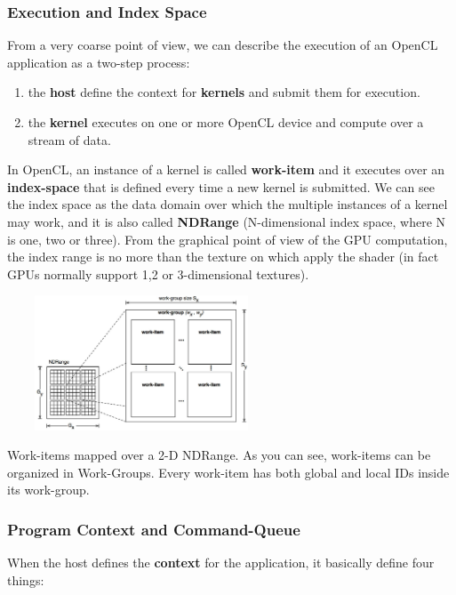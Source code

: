 \subsubsection{Execution and Index Space}

From a very coarse point of view, we can describe the execution of an OpenCL application as a two-step process:

\begin{enumerate}
	\item the \textbf{host} define the context for \textbf{kernels} and submit them for execution.
	\item the \textbf{kernel} executes on one or more OpenCL device and compute over a stream of data.
\end{enumerate}

In OpenCL, an instance of a kernel is called \textbf{work-item} and it executes over an \textbf{index-space} that is defined every time a new kernel is submitted. We can see the index space as the data domain over which the multiple instances of a kernel may work, and it is also called \textbf{NDRange} (N-dimensional index space, where N is one, two or three). From the graphical point of view of the GPU computation, the index range is no more than the texture on which apply the shader (in fact GPUs normally support 1,2 or 3-dimensional textures).\\

\begin{figurehere}
 \centering
 \includegraphics[width=8cm, height=4cm]{./eps/index-space.eps}
 \caption{Work-items mapped over a 2-D NDRange. As you can see, work-items can be organized in Work-Groups. Every work-item has both global and local IDs inside its work-group.}
 \label{fig:indexSpace}
\end{figurehere}

\subsubsection{Program Context and Command-Queue} \label{sect:context}

When the host defines the \textbf{context} for the application, it basically define four things:

